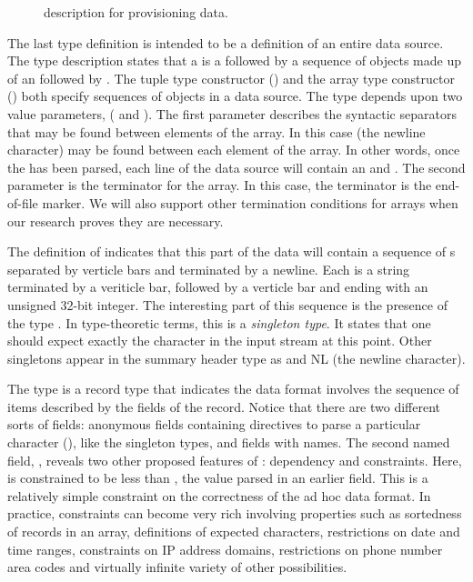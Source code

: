\suppressfloats

\begin{figure}
\begin {code}

\end{code}
\caption{\datatype{} description for \dibbler{} provisioning data.}
\label{figure:dibblerml}
\end{figure}

The last type definition  is intended to be a definition of
an entire \dibbler{} data source.  The type description states that a
 is a  followed by a sequence of
objects made up of an  followed by .  The
tuple type constructor () and the array type constructor
() both specify sequences of objects in a data
source.  The  type depends upon two value parameters,
( and ).  The first parameter describes the syntactic
separators that may be found between elements of the array.  In this
case  (the newline character) may be found between each element
of the array.  In other words, once the  has been
parsed, each line of the data source will contain an
 and .  The second parameter is the
terminator for the array.  In this case, the terminator is the
end-of-file marker.  We will also support other termination conditions
for arrays when our research proves they are necessary.

The definition of  indicates that this part of the
\dibbler{} data will contain a sequence of s separated by
verticle bars and terminated by a newline.  Each  is a
string terminated by a veriticle bar, followed by a verticle bar and
ending with an unsigned 32-bit integer.  The interesting part of this
sequence is the presence of the type .  In type-theoretic
terms, this is a {\em singleton type}.  It states that one should
expect exactly the character  in the input stream at this
point.  Other singletons appear in the summary header type as
 and NL (the newline character).

The type  is a record type that indicates
the data format involves the sequence of items described by
the fields of the record.  Notice that there are two different
sorts of fields: anonymous fields containing directives to parse
a particular character (), like the singleton types,
and fields with names.  The second named field,
, reveals two other proposed features of 
\datatype: dependency and constraints.  Here,
 is constrained to be less than
, the value parsed in an earlier field.
This is a relatively simple constraint on the correctness of the
ad hoc data format.  In practice, constraints can become very rich
involving properties such as sortedness of records in an array,
definitions of expected characters,
restrictions on date and time ranges, constraints on IP address
domains, restrictions on phone number area codes and virtually 
infinite variety of other possibilities. 

